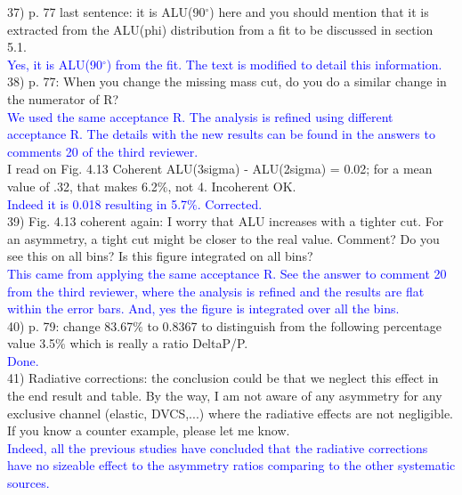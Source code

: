 37) p. 77 last sentence: it is ALU(90$^{\circ}$) here and you should mention that it is 
extracted from the ALU(phi) distribution from a fit to be discussed in section 
5.1.\\
\textcolor{blue}{Yes, it is ALU(90$^{\circ}$) from the fit. The text is modified to 
detail this information.}\\



38) p. 77: When you change the missing mass cut, do you do a similar change in 
the numerator of R? \\
\textcolor{blue}{We used the same acceptance R. The analysis is refined using 
different acceptance R. The details with the new results can be found in the 
answers to comments 20 of the third reviewer.  }\\

I read on Fig. 4.13 Coherent ALU(3sigma) - ALU(2sigma) = 0.02; for a mean value 
of .32, that makes 6.2$\%$, not 4. Incoherent OK.\\
\textcolor{blue}{ Indeed it is 0.018 resulting in 5.7$\%$. Corrected.}\\

39) Fig. 4.13 coherent again: I worry that ALU increases with a tighter cut.  
For an asymmetry, a tight cut might be closer to the real value. Comment?  Do 
you see this on all bins? Is this figure integrated on all bins?\\
\textcolor{blue}{ This came from applying the same acceptance R. See the answer 
to comment 20 from the third reviewer, where the analysis is refined and the 
results are flat within the error bars. And, yes the figure is integrated over all the 
bins.  }\\

40) p. 79: change 83.67$\%$ to 0.8367 to distinguish from the following 
percentage value 3.5$\%$ which is really a ratio DeltaP/P.\\
\textcolor{blue}{ Done.}\\

41) Radiative corrections: the conclusion could be that we neglect this effect in 
the end result and table. By the way, I am not aware of any asymmetry for any 
exclusive channel (elastic, DVCS,...) where the radiative effects are not 
negligible. If you know a counter example, please let me know. \\
\textcolor{blue}{ Indeed, all the previous studies have concluded that the radiative 
corrections have no sizeable effect to the asymmetry ratios comparing to the 
other systematic sources. }\\


